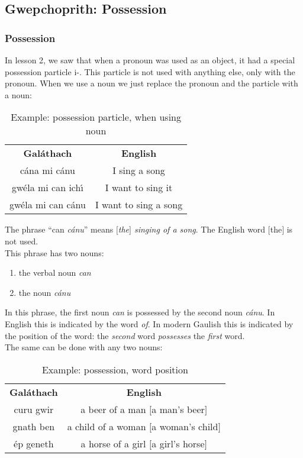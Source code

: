 \subsection{Gwepchoprith: Possession}
\subsubsection{Possession}

In lesson 2, we saw that when a pronoun was used as an object, it had a special possession particle i-. This particle is not used with anything else, only with the pronoun. When we use a noun we just replace the pronoun and the particle with a noun:

\begin{table}[H]
\centering
\begin{tabular}{cc}
  \toprule
  \textbf{Gal\'{a}thach} & \textbf{English}\\
  \cmidrule(lr){1-1}\cmidrule(lr){2-2}
  c\'{a}na mi c\'{a}nu & I sing a song\\
  gw\'{e}la mi can ich\'{\i} & I want to sing it\\
  gw\'{e}la mi can c\'{a}nu & I want to sing a song\\
  \bottomrule
\end{tabular}
\caption{Example: possession particle, when using noun}
\label{example_possession_particle_when_using_noun}
\end{table}

The phrase ``can \textit{c\'{a}nu}'' means \textit{$[$the$]$ singing of a song}. The English word $[$the$]$ is not used.\\

This phrase has two nouns:
\begin{enumerate}
 \item{the verbal noun \textit{can}}
 \item{the noun \textit{c\'{a}nu}}
\end{enumerate}
In this phrase, the first noun \textit{can} is possessed by the second noun \textit{c\'{a}nu}. In English this is indicated by the word \textit{of}. In modern Gaulish this is indicated by the position of the word: the \textit{second} word \textit{possesses} the \textit{first} word.\\

The same can be done with any two nouns:
\begin{table}[H]
\centering
\begin{tabular}{cc}
  \toprule
  \textbf{Gal\'{a}thach} & \textbf{English}\\
  \cmidrule(lr){1-1}\cmidrule(lr){2-2}
  curu gwir & a beer of a man $[$a man's beer$]$\\
  gnath ben & a child of a woman $[$a woman's child$]$\\
  \'{e}p geneth & a horse of a girl $[$a girl's horse$]$\\
  \bottomrule
\end{tabular}
\caption{Example: possession, word position}
\label{example_possession_word_position}
\end{table}

